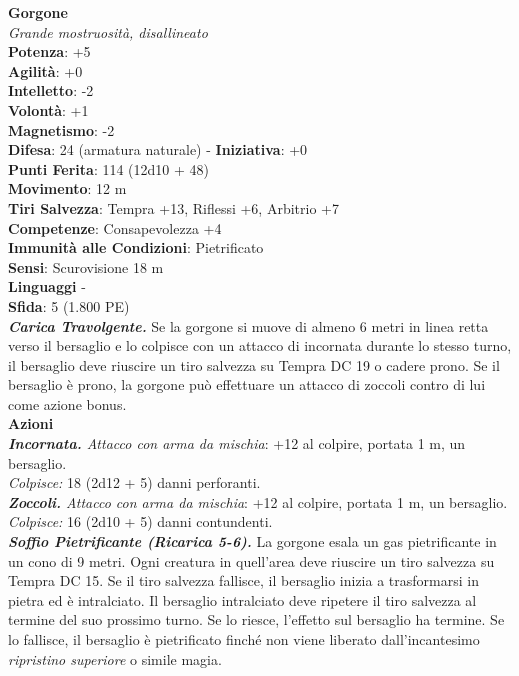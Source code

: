 \begin{multicols}{2}
\medskip\textbf{Gorgone}\\
\emph{Grande mostruosità, disallineato}\\
\textbf{Potenza}: +5\\
\textbf{Agilità}: +0\\
\textbf{Intelletto}: -2\\
\textbf{Volontà}: +1\\
\textbf{Magnetismo}: -2\\
\textbf{Difesa}: 24 (armatura naturale) - \textbf{Iniziativa}: +0\\
\textbf{Punti Ferita}: 114 (12d10 + 48)\\
\textbf{Movimento}: 12 m\\
\textbf{Tiri Salvezza}: Tempra +13, Riflessi +6, Arbitrio +7\\
\textbf{Competenze}: Consapevolezza +4\\
\textbf{Immunità alle Condizioni}: Pietrificato\\
\textbf{Sensi}: Scurovisione 18 m\\
\textbf{Linguaggi} -\\
\textbf{Sfida}: 5 (1.800 PE)\smallskip\\
\emph{\textbf{Carica Travolgente.}} Se la gorgone si muove di almeno 6 metri in linea retta verso il bersaglio e lo colpisce con un attacco di incornata durante lo stesso turno, il bersaglio deve riuscire un tiro salvezza su Tempra DC  19 o cadere prono. Se il bersaglio è prono, la gorgone può effettuare un attacco di zoccoli contro di lui come azione bonus.\\
\smallskip\textbf{Azioni}\\
\emph{\textbf{Incornata.} Attacco con arma da mischia}: +12 al colpire, portata 1 m, un bersaglio.\\
\emph{Colpisce:} 18 (2d12 + 5) danni perforanti.\\
\emph{\textbf{Zoccoli.} Attacco con arma da mischia}: +12 al colpire, portata 1 m, un bersaglio.\\
\emph{Colpisce:} 16 (2d10 + 5) danni contundenti.\\
\emph{\textbf{Soffio Pietrificante (Ricarica 5-6).}} La gorgone esala un gas pietrificante in un cono di 9 metri. Ogni creatura in quell'area deve riuscire un tiro salvezza su Tempra DC  15. Se il tiro salvezza fallisce, il bersaglio inizia a trasformarsi in pietra ed è intralciato. Il bersaglio intralciato deve ripetere il tiro salvezza al termine del suo prossimo turno. Se lo riesce, l'effetto sul bersaglio ha termine. Se lo fallisce, il bersaglio è pietrificato finché non viene liberato dall'incantesimo \emph{ripristino superiore} o simile magia.\\

\end{multicols}
